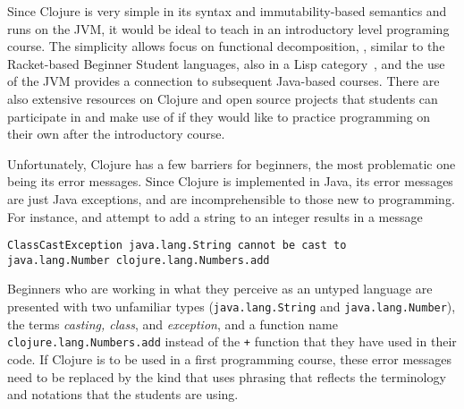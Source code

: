 \documentclass[12pt]{article}
\begin{document}
Since Clojure is very simple in its syntax and immutability-based semantics and runs on the JVM, it would be ideal to teach in an introductory level programing course.
The simplicity allows focus on functional decomposition, , similar to 
the Racket-based Beginner Student languages, also in a Lisp category~\cite{htdp}, and the use of the JVM provides a connection to subsequent Java-based courses. 
There are also extensive resources on Clojure and open source projects that students can participate in and make use of if they would like 
to practice programming on their own after the introductory course. 

Unfortunately, Clojure has a few barriers for beginners, the most problematic one being its error messages. Since Clojure is implemented in Java, 
its error messages are just Java exceptions, and are incomprehensible to those new to programming. For instance, and attempt to add a string to an integer 
results in a message 

\noindent
\begin{verbatim}
ClassCastException java.lang.String cannot be cast to 
java.lang.Number clojure.lang.Numbers.add
\end{verbatim}

\noindent 
Beginners who are working in what they perceive as an untyped language are presented with two unfamiliar types 
({\tt java.lang.String} and {\tt java.lang.Number}), the terms {\it casting, class}, and {\it exception}, and a function
name {\tt clojure.lang.Numbers.add} instead of the {\tt +} function that they have used in their code. 
If Clojure is to be used in a first programming course, these error messages need to be replaced by the kind that
uses phrasing that reflects the terminology and notations that the students are using. 
\end{document}
